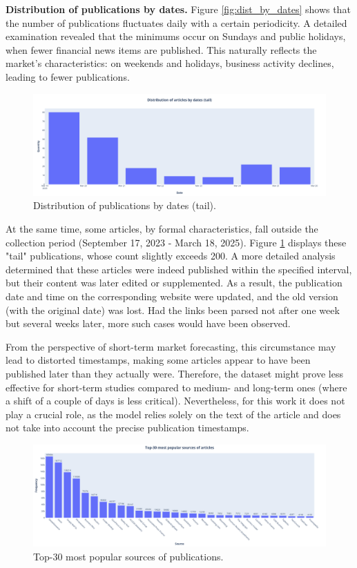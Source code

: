 \textbf{Distribution of publications by dates.} Figure \ref{fig:dist_by_dates} shows that the number of publications
fluctuates daily with a certain periodicity. A detailed examination revealed that the minimums occur on Sundays and
public holidays, when fewer financial news items are published. This naturally reflects the market’s characteristics:
on weekends and holidays, business activity declines, leading to fewer publications.

\begin{figure}[H]
    \centering
    \includegraphics[width=1\linewidth]{img/articles_dist_by_dates_tail.png}
    \caption{\label{fig:dist_by_dates_tail}Distribution of publications by dates (tail).}
\end{figure}

At the same time, some articles, by formal characteristics, fall outside the collection period (September 17, 2023 - March 18, 2025).
Figure \ref{fig:dist_by_dates_tail} displays these "tail" publications, whose count slightly exceeds 200. A more detailed analysis
determined that these articles were indeed published within the specified interval, but their content was later edited or supplemented.
As a result, the publication date and time on the corresponding website were updated, and the old version (with the original date) was
lost. Had the links been parsed not after one week but several weeks later, more such cases would have been observed.

From the perspective of short-term market forecasting, this circumstance may lead to distorted timestamps, making some articles appear
to have been published later than they actually were. Therefore, the dataset might prove less effective for short-term studies compared
to medium- and long-term ones (where a shift of a couple of days is less critical). Nevertheless, for this work it does not play
a crucial role, as the model relies solely on the text of the article and does not take into account the precise publication timestamps.

\begin{figure}[H]
    \centering
    \includegraphics[width=1\linewidth]{img/top30_sources.png}
    \caption{\label{fig:dist_sources}Top-30 most popular sources of publications.}
\end{figure}

